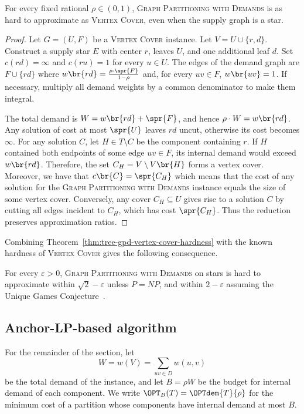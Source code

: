 \begin{theorem}\label{thm:tree-gpd-vertex-cover-hardness}
    For every fixed rational $\rho\in(0,1)$, \textsc{Graph Partitioning with Demands} is as hard to approximate as \textsc{Vertex Cover}, even when the supply graph is a star.
\end{theorem}
\begin{proof}
    Let $G=(U,F)$ be a \textsc{Vertex Cover} instance. Let $V=U\cup\{r,d\}$. Construct a supply star $E$ with center $r$, leaves $U$, and one additional leaf $d$. Set $c(rd)=\infty$ and $c(ru)=1$ for every $u\in U$. The edges of the demand graph are $F\cup\{rd\}$ where $w\br{rd}=\frac{\rho \cdot \spr{F}}{1-\rho}$ and, for every $uv\in F$, $w\br{uv}=1$. If necessary, multiply all demand weights by a common denominator to make them integral.

    The total demand is $W=w\br{rd}+\spr{F}$, and hence $\rho \cdot W=w\br{rd}$. Any solution of cost at most $\spr{U}$ leaves $rd$ uncut, otherwise its cost becomes $\infty$. For any solution $C$, let $H\in T\setminus C$ be the component containing $r$. If $H$ contained both endpoints of some edge $uv\in F$, its internal demand would exceed $w\br{rd}$. Therefore, the set $C_H=V\setminus V\br{H}$ forms a vertex cover. Moreover, we have that $c\br{C}=\spr{C_H}$ which means that the cost of any solution for the \textsc{Graph Partitioning with Demands} instance equals the size of some vertex cover. Conversely, any cover $C_H\subseteq U$ gives rise to a solution $C$ by cutting all edges incident to $C_H$, which has cost $\spr{C_H}$. Thus the reduction preserves approximation ratios.
\end{proof}

Combining Theorem~\ref{thm:tree-gpd-vertex-cover-hardness} with the known hardness of \textsc{Vertex Cover} gives the following consequence.
\begin{corollary}\label{cor:tree-gpd-hardness}
    For every $\varepsilon>0$, \textsc{Graph Partitioning with Demands} on stars is hard to approximate within $\sqrt{2}-\varepsilon$ unless $P=NP$, and within $2-\varepsilon$ assuming the Unique Games Conjecture~\cite{TowardsAProofOfThe2To1GamesConjecture,VertexCoverMightBeHardToApproximateToWithin2MinusEpsilon}.
\end{corollary}

\subsection{Anchor-LP-based algorithm}
For the remainder of the section, let
\[
    W=w(V)=\sum_{uv\in D}w(u,v)
\]
be the total demand of the instance, and let $B=\rho W$ be the budget for internal demand of each component. We write $\OPT_B(T)=\OPTdem{T}{\rho}$ for the minimum cost of a partition whose components have internal demand at most $B$.

